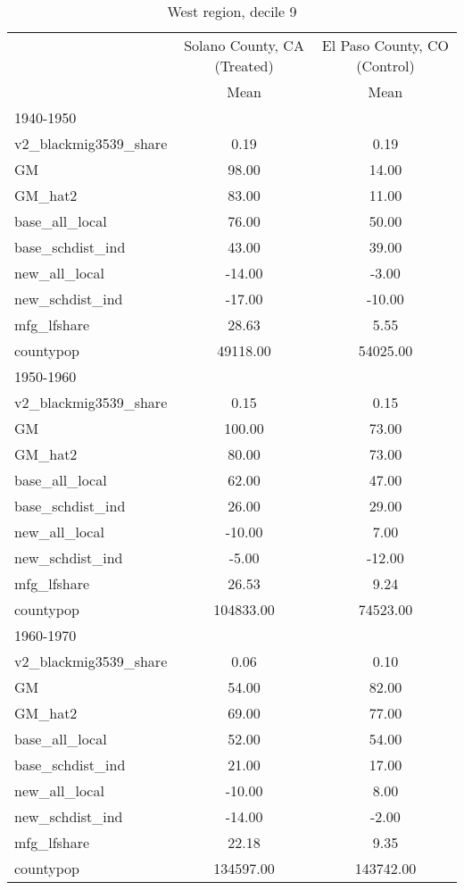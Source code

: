 \begin{table}[htbp]\centering
\def\sym#1{\ifmmode^{#1}\else\(^{#1}\)\fi}
\caption{West region, decile 9 \label{tab1}}
\begin{tabular}{l*{2}{c}}
\toprule
                    &\multicolumn{1}{c}{Solano County, CA (Treated)}&\multicolumn{1}{c}{El Paso County, CO (Control)}\\
                    &        Mean&        Mean\\
\midrule
1940-1950           &            &            \\
v2\_blackmig3539\_share&        0.19&        0.19\\
GM                  &       98.00&       14.00\\
GM\_hat2             &       83.00&       11.00\\
base\_all\_local      &       76.00&       50.00\\
base\_schdist\_ind    &       43.00&       39.00\\
new\_all\_local       &      -14.00&       -3.00\\
new\_schdist\_ind     &      -17.00&      -10.00\\
mfg\_lfshare         &       28.63&        5.55\\
countypop           &    49118.00&    54025.00\\
\midrule
1950-1960           &            &            \\
v2\_blackmig3539\_share&        0.15&        0.15\\
GM                  &      100.00&       73.00\\
GM\_hat2             &       80.00&       73.00\\
base\_all\_local      &       62.00&       47.00\\
base\_schdist\_ind    &       26.00&       29.00\\
new\_all\_local       &      -10.00&        7.00\\
new\_schdist\_ind     &       -5.00&      -12.00\\
mfg\_lfshare         &       26.53&        9.24\\
countypop           &   104833.00&    74523.00\\
\midrule
1960-1970           &            &            \\
v2\_blackmig3539\_share&        0.06&        0.10\\
GM                  &       54.00&       82.00\\
GM\_hat2             &       69.00&       77.00\\
base\_all\_local      &       52.00&       54.00\\
base\_schdist\_ind    &       21.00&       17.00\\
new\_all\_local       &      -10.00&        8.00\\
new\_schdist\_ind     &      -14.00&       -2.00\\
mfg\_lfshare         &       22.18&        9.35\\
countypop           &   134597.00&   143742.00\\
\bottomrule
\end{tabular}
\end{table}

